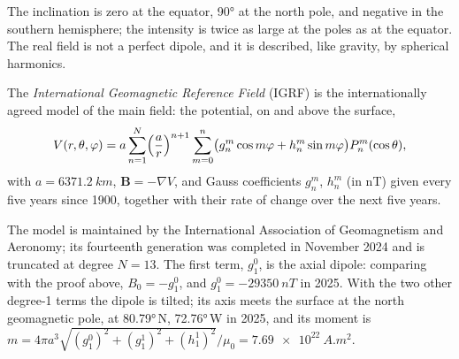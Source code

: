 The inclination is zero at the equator, \ang{90} at the north pole, and
negative in the southern hemisphere; the intensity is twice as large at the
poles as at the equator. The real field is not a perfect dipole, and it is
described, like gravity, by spherical harmonics.

\begin{definition}\label{def:b3:palaeomagnetism:igrf}
The \emph{International Geomagnetic Reference Field}
(IGRF) is the internationally agreed model of the
main field: the potential, on and above the surface,
\[
  V(r,\theta,\varphi) = a\sum_{n=1}^{N}\Bigl(\frac ar\Bigr)^{n+1}\sum_{m=0}^{n}
  \bigl(g_n^m\cos m\varphi + h_n^m\sin m\varphi\bigr)P_n^m(\cos\theta),
\]
with $a = \qty{6371.2}{km}$, $\mathbf B = -\nabla V$, and Gauss coefficients
$g_n^m$, $h_n^m$ (in \unit{nT}) given every five years since 1900, together
with their rate of change over the next five years.
\end{definition}

The model is maintained by the International Association of Geomagnetism and
Aeronomy; its fourteenth generation was completed in November 2024 and is
truncated at degree $N = 13$. The first term, $g_1^0$, is the axial dipole:
comparing with the proof above, $B_0 = -g_1^0$, and $g_1^0 = \qty{-29350}{nT}$
in 2025. With the two other degree-1 terms the dipole is tilted; its axis meets
the surface at the north geomagnetic pole, at \ang{80.79}\,N, \ang{72.76}\,W in
2025, and its moment is $m = 4\pi a^3\sqrt{(g_1^0)^2 + (g_1^1)^2 +
(h_1^1)^2}/\mu_0 = \qty{7.69e22}{A.m^2}$.

